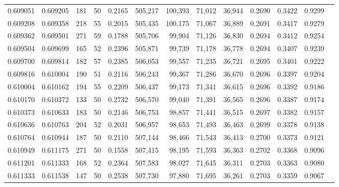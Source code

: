 \begin{tabular}{rrrrrrrrrrrrr}
0.609051 & 0.609205 &   181 &  50 &                                     0.2165 & 505,217 & 100,393 &  71,012 &  36,944 & 0.2690 & 0.3422 & 0.9299 \\
0.609208 & 0.609358 &   218 &  55 &                                     0.2015 & 505,435 & 100,175 &  71,067 &  36,889 & 0.2691 & 0.3417 & 0.9279 \\
0.609362 & 0.609501 &   271 &  59 &                                     0.1788 & 505,706 &  99,904 &  71,126 &  36,830 & 0.2694 & 0.3412 & 0.9254 \\
0.609504 & 0.609699 &   165 &  52 &                                     0.2396 & 505,871 &  99,739 &  71,178 &  36,778 & 0.2694 & 0.3407 & 0.9239 \\
0.609700 & 0.609814 &   182 &  57 &                                     0.2385 & 506,053 &  99,557 &  71,235 &  36,721 & 0.2695 & 0.3401 & 0.9222 \\
0.609816 & 0.610004 &   190 &  51 &                                     0.2116 & 506,243 &  99,367 &  71,286 &  36,670 & 0.2696 & 0.3397 & 0.9204 \\
0.610004 & 0.610162 &   194 &  55 &                                     0.2209 & 506,437 &  99,173 &  71,341 &  36,615 & 0.2696 & 0.3392 & 0.9186 \\
0.610170 & 0.610372 &   133 &  50 &                                     0.2732 & 506,570 &  99,040 &  71,391 &  36,565 & 0.2696 & 0.3387 & 0.9174 \\
0.610373 & 0.610633 &   183 &  50 &                                     0.2146 & 506,753 &  98,857 &  71,441 &  36,515 & 0.2697 & 0.3382 & 0.9157 \\
0.610636 & 0.610763 &   204 &  52 &                                     0.2031 & 506,957 &  98,653 &  71,493 &  36,463 & 0.2699 & 0.3378 & 0.9138 \\
0.610764 & 0.610944 &   187 &  50 &                                     0.2110 & 507,144 &  98,466 &  71,543 &  36,413 & 0.2700 & 0.3373 & 0.9121 \\
0.610949 & 0.611175 &   271 &  50 &                                     0.1558 & 507,415 &  98,195 &  71,593 &  36,363 & 0.2702 & 0.3368 & 0.9096 \\
0.611201 & 0.611333 &   168 &  52 &                                     0.2364 & 507,583 &  98,027 &  71,645 &  36,311 & 0.2703 & 0.3363 & 0.9080 \\
0.611333 & 0.611538 &   147 &  50 &                                     0.2538 & 507,730 &  97,880 &  71,695 &  36,261 & 0.2703 & 0.3359 & 0.9067 \\

\end{tabular}
